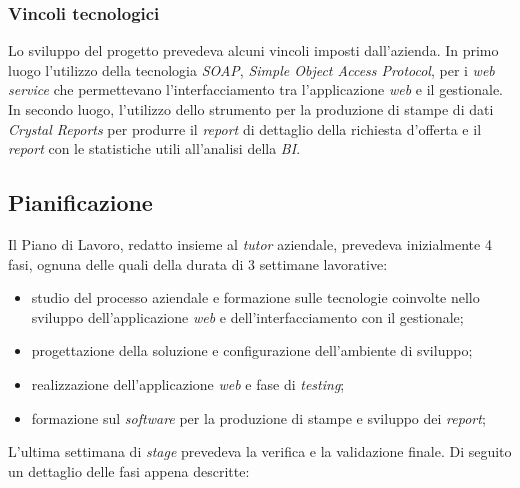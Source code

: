 \subsubsection{Vincoli tecnologici}
Lo sviluppo del progetto prevedeva alcuni vincoli imposti dall'azienda.
In primo luogo l'utilizzo della tecnologia \textit{SOAP}, \textit{Simple Object Access Protocol}, per i \textit{web service} che permettevano l'interfacciamento tra l'applicazione \textit{web} e il gestionale.
In secondo luogo, l'utilizzo dello strumento per la produzione di stampe di dati \textit{Crystal Reports} per produrre il \textit{report} di dettaglio della richiesta d'offerta e il \textit{report} con le statistiche utili all'analisi della \textit{BI}.


\subsection{Pianificazione}

Il Piano di Lavoro, redatto insieme al \textit{tutor} aziendale, prevedeva inizialmente 4 fasi, ognuna delle quali della durata di 3 settimane lavorative:
\begin{itemize}
	\item studio del processo aziendale e formazione sulle tecnologie coinvolte nello sviluppo dell'applicazione \textit{web} e dell'interfacciamento con il gestionale;
	\item progettazione della soluzione e configurazione dell'ambiente di sviluppo;
	\item realizzazione dell'applicazione \textit{web} e fase di \textit{testing};
	\item formazione sul \textit{software} per la produzione di stampe e sviluppo dei \textit{report};
\end{itemize}
L'ultima settimana di \textit{stage} prevedeva la verifica e la validazione finale.
Di seguito un dettaglio delle fasi appena descritte:

